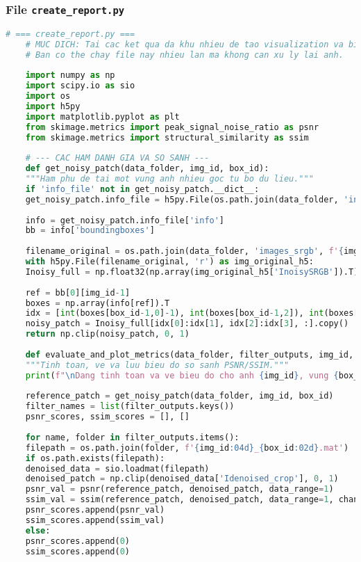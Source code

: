 \documentclass[12pt, a4paper]{article}
\begin{document}
\subsubsection{File \texttt{create\_report.py}}
\begin{lstlisting}[language=Python, caption={Mã nguồn tạo báo cáo tùy chọn và biểu đồ.}, label={lst:create_report}]
	# === create_report.py ===
	# MUC DICH: Tai cac ket qua da khu nhieu de tao visualization va bieu do so sanh.
	# Ban co the chay file nay nhieu lan ma khong can xu ly lai anh.
	
	import numpy as np
	import scipy.io as sio
	import os
	import h5py
	import matplotlib.pyplot as plt
	from skimage.metrics import peak_signal_noise_ratio as psnr
	from skimage.metrics import structural_similarity as ssim
	
	# --- CAC HAM DANH GIA VA SO SANH ---
	def get_noisy_patch(data_folder, img_id, box_id):
	"""Ham phu de tai mot vung anh nhieu goc tu bo du lieu."""
	if 'info_file' not in get_noisy_patch.__dict__:
	get_noisy_patch.info_file = h5py.File(os.path.join(data_folder, 'info.mat'), 'r')
	
	info = get_noisy_patch.info_file['info']
	bb = info['boundingboxes']
	
	filename_original = os.path.join(data_folder, 'images_srgb', f'{img_id:04d}.mat')
	with h5py.File(filename_original, 'r') as img_original_h5:
	Inoisy_full = np.float32(np.array(img_original_h5['InoisySRGB']).T)
	
	ref = bb[0][img_id-1]
	boxes = np.array(info[ref]).T
	idx = [int(boxes[box_id-1,0]-1), int(boxes[box_id-1,2]), int(boxes[box_id-1,1]-1), int(boxes[box_id-1,3])]
	noisy_patch = Inoisy_full[idx[0]:idx[1], idx[2]:idx[3], :].copy()
	return np.clip(noisy_patch, 0, 1)
	
	def evaluate_and_plot_metrics(data_folder, filter_outputs, img_id, box_id):
	"""Tinh toan, ve va luu bieu do so sanh PSNR/SSIM."""
	print(f"\nDang tinh toan va ve bieu do cho anh {img_id}, vung {box_id}...")
	
	reference_patch = get_noisy_patch(data_folder, img_id, box_id)
	filter_names = list(filter_outputs.keys())
	psnr_scores, ssim_scores = [], []
	
	for name, folder in filter_outputs.items():
	filepath = os.path.join(folder, f'{img_id:04d}_{box_id:02d}.mat')
	if os.path.exists(filepath):
	denoised_data = sio.loadmat(filepath)
	denoised_patch = np.clip(denoised_data['Idenoised_crop'], 0, 1)
	psnr_val = psnr(reference_patch, denoised_patch, data_range=1)
	ssim_val = ssim(reference_patch, denoised_patch, data_range=1, channel_axis=2, win_size=7)
	psnr_scores.append(psnr_val)
	ssim_scores.append(ssim_val)
	else:
	psnr_scores.append(0)
	ssim_scores.append(0)
	

\end{lstlisting}
\end{document}
